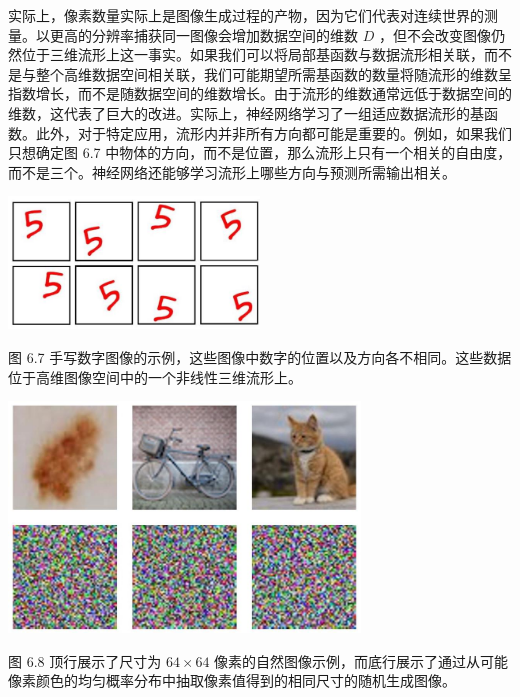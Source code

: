 \documentclass[10pt]{report}
\begin{document}
实际上，像素数量实际上是图像生成过程的产物，因为它们代表对连续世界的测量。以更高的分辨率捕获同一图像会增加数据空间的维数 \(D\) ，但不会改变图像仍然位于三维流形上这一事实。如果我们可以将局部基函数与数据流形相关联，而不是与整个高维数据空间相关联，我们可能期望所需基函数的数量将随流形的维数呈指数增长，而不是随数据空间的维数增长。由于流形的维数通常远低于数据空间的维数，这代表了巨大的改进。实际上，神经网络学习了一组适应数据流形的基函数。此外，对于特定应用，流形内并非所有方向都可能是重要的。例如，如果我们只想确定图 6.7 中物体的方向，而不是位置，那么流形上只有一个相关的自由度，而不是三个。神经网络还能够学习流形上哪些方向与预测所需输出相关。

\begin{center}
\includegraphics[max width=0.5\textwidth]{images/0194e279-9b28-703a-88f4-c3ac21e2010d_196_911_1676_638_337_0.jpg}
\end{center}
\hspace*{3em} 

图 6.7 手写数字图像的示例，这些图像中数字的位置以及方向各不相同。这些数据位于高维图像空间中的一个非线性三维流形上。

\begin{center}
\includegraphics[max width=0.7\textwidth]{images/0194e279-9b28-703a-88f4-c3ac21e2010d_197_549_356_920_605_0.jpg}
\end{center}
\hspace*{3em} 

图 6.8 顶行展示了尺寸为 \({64} \times  {64}\) 像素的自然图像示例，而底行展示了通过从可能像素颜色的均匀概率分布中抽取像素值得到的相同尺寸的随机生成图像。
\end{document}
